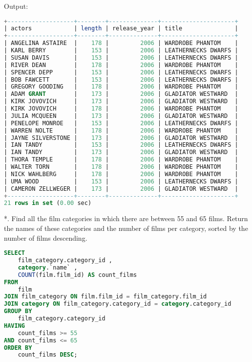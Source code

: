 \documentclass[12pt]{report}
\begin{document}
Output:
\begin{lstlisting}[language=sql]
+-------------------+--------+--------------+---------------------+
| actors            | length | release_year | title               |
+-------------------+--------+--------------+---------------------+
| ANGELINA ASTAIRE  |    178 |         2006 | WARDROBE PHANTOM    |
| KARL BERRY        |    153 |         2006 | LEATHERNECKS DWARFS |
| SUSAN DAVIS       |    153 |         2006 | LEATHERNECKS DWARFS |
| RIVER DEAN        |    178 |         2006 | WARDROBE PHANTOM    |
| SPENCER DEPP      |    153 |         2006 | LEATHERNECKS DWARFS |
| BOB FAWCETT       |    153 |         2006 | LEATHERNECKS DWARFS |
| GREGORY GOODING   |    178 |         2006 | WARDROBE PHANTOM    |
| ADAM GRANT        |    173 |         2006 | GLADIATOR WESTWARD  |
| KIRK JOVOVICH     |    173 |         2006 | GLADIATOR WESTWARD  |
| KIRK JOVOVICH     |    178 |         2006 | WARDROBE PHANTOM    |
| JULIA MCQUEEN     |    173 |         2006 | GLADIATOR WESTWARD  |
| PENELOPE MONROE   |    153 |         2006 | LEATHERNECKS DWARFS |
| WARREN NOLTE      |    178 |         2006 | WARDROBE PHANTOM    |
| JAYNE SILVERSTONE |    173 |         2006 | GLADIATOR WESTWARD  |
| IAN TANDY         |    153 |         2006 | LEATHERNECKS DWARFS |
| IAN TANDY         |    173 |         2006 | GLADIATOR WESTWARD  |
| THORA TEMPLE      |    178 |         2006 | WARDROBE PHANTOM    |
| WALTER TORN       |    178 |         2006 | WARDROBE PHANTOM    |
| NICK WAHLBERG     |    178 |         2006 | WARDROBE PHANTOM    |
| UMA WOOD          |    153 |         2006 | LEATHERNECKS DWARFS |
| CAMERON ZELLWEGER |    173 |         2006 | GLADIATOR WESTWARD  |
+-------------------+--------+--------------+---------------------+
21 rows in set (0.00 sec)
\end{lstlisting}

*. Find all the film categories in which there are between 55 and 65 films. Return the names of these categories and the number of films per category, sorted by the number of films descending.
\begin{lstlisting}[language=sql]
SELECT
	film_category.category_id ,
	category.`name` ,
	COUNT(film.film_id) AS count_films
FROM
	film
JOIN film_category ON film.film_id = film_category.film_id
JOIN category ON film_category.category_id = category.category_id
GROUP BY
	film_category.category_id
HAVING
	count_films >= 55
AND count_films <= 65
ORDER BY
	count_films DESC;
\end{lstlisting}
\end{document}
